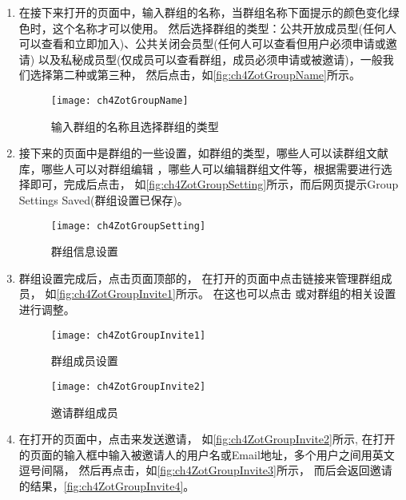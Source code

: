 \documentclass[theorem=false,mathfont=none,openany,sub3section]{easybook}
\begin{document}
\begin{enumerate}
	\item 在接下来打开的页面中，输入群组的名称，当群组名称下面提示的颜色变化绿色时，这个名称才可以使用。
	然后选择群组的类型：公共开放成员型(任何人可以查看和立即加入)、公共关闭会员型(任何人可以查看但用户必须申请或邀请)
	以及私秘成员型(仅成员可以查看群组，成员必须申请或被邀请)，一般我们选择第二种或第三种，
	然后点击，如\autoref{fig:ch4ZotGroupName}所示。
	\begin{figure}[htbp]
		\centering
		\texttt{[image: ch4ZotGroupName]}
		\caption{输入群组的名称且选择群组的类型}
		\label{fig:ch4ZotGroupName}
	\end{figure}
	\item 接下来的页面中是群组的一些设置，如群组的类型，哪些人可以读群组文献库，哪些人可以对群组编辑
	，哪些人可以编辑群组文件等，根据需要进行选择即可，完成后点击，
	如\autoref{fig:ch4ZotGroupSetting}所示，而后网页提示Group Settings Saved(群组设置已保存)。
	\begin{figure}[htbp]
		\centering
		\texttt{[image: ch4ZotGroupSetting]}
		\caption{群组信息设置}
		\label{fig:ch4ZotGroupSetting}
	\end{figure}
	\item 群组设置完成后，点击页面顶部的，
	在打开的页面中点击链接来管理群组成员，
	如\autoref{fig:ch4ZotGroupInvite1}所示。
	在这也可以点击
	或对群组的相关设置进行调整。
	\begin{figure}[htbp]
		\centering
		\begin{minipage}[t]{\dimexpr.5\textwidth-1em}
			\centering
			\texttt{[image: ch4ZotGroupInvite1]}
			\caption{群组成员设置}
			\label{fig:ch4ZotGroupInvite1}
		\end{minipage}
		\begin{minipage}[t]{\dimexpr.5\textwidth-1em}
			\centering
			\texttt{[image: ch4ZotGroupInvite2]}
			\caption{邀请群组成员}
			\label{fig:ch4ZotGroupInvite2}	
		\end{minipage}	 
	\end{figure}
	\item 在打开的页面中，点击来发送邀请，
	如\autoref{fig:ch4ZotGroupInvite2}所示,
	在打开的页面的输入框中输入被邀请人的用户名或Email地址，多个用户之间用英文逗号间隔，
	然后再点击，如\autoref{fig:ch4ZotGroupInvite3}所示，
	而后会返回邀请的结果，\autoref{fig:ch4ZotGroupInvite4}。

\end{enumerate}
\end{document}
